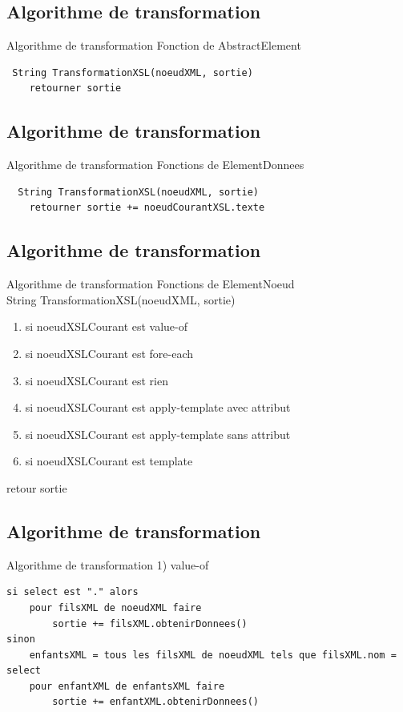\documentclass[aspectratio=169]{beamer}
\begin{document}
\subsection{Algorithme de transformation}
\begin{frame}[fragile]{Algorithme de transformation}
Fonction de AbstractElement
\scriptsize
\begin{verbatim}
 String TransformationXSL(noeudXML, sortie)
    retourner sortie
\end{verbatim}
\end{frame}

\subsection{Algorithme de transformation}
\begin{frame}[fragile]{Algorithme de transformation}
 Fonctions de ElementDonnees
 \scriptsize
 \begin{verbatim}
  String TransformationXSL(noeudXML, sortie)
    retourner sortie += noeudCourantXSL.texte
 \end{verbatim}
 \normalsize
\end{frame}

\subsection{Algorithme de transformation}
\begin{frame}{Algorithme de transformation}
 Fonctions de ElementNoeud\\
 \scriptsize
String TransformationXSL(noeudXML, sortie)\\
\begin{enumerate}
 \item si noeudXSLCourant est value-of
 \item si noeudXSLCourant est fore-each
 \item si noeudXSLCourant est rien
 \item si noeudXSLCourant est apply-template avec attribut
 \item si noeudXSLCourant est apply-template sans attribut
 \item si noeudXSLCourant est template
\end{enumerate}
retour sortie
\normalsize
\end{frame}

\subsection{Algorithme de transformation}
\begin{frame}[fragile]{Algorithme de transformation}
1) value-of
\scriptsize
\begin{verbatim}
si select est "." alors
    pour filsXML de noeudXML faire
        sortie += filsXML.obtenirDonnees()
sinon
    enfantsXML = tous les filsXML de noeudXML tels que filsXML.nom = select
    pour enfantXML de enfantsXML faire
        sortie += enfantXML.obtenirDonnees()
\end{verbatim}
\normalsize
\end{frame}
\end{document}
